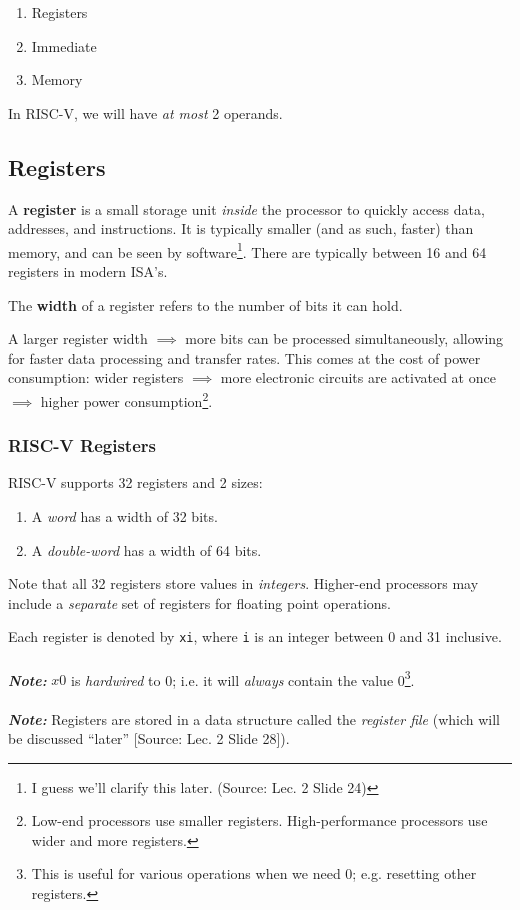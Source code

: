 \documentclass{report}
\newcommand{\definition}[2]{\begin{tcolorbox}[title={Definition: #1}]{#2}\end{tcolorbox}}
\newcommand{\aside}[2]{\begin{tcolorbox}[colback=orange!5!white,colframe=black!75!orange,title={Aside:
      #1}]{#2}\end{tcolorbox}}
\begin{document}
\begin{enumerate}[label=\textit{(\roman*)}]
\item Registers
\item Immediate
\item Memory
\end{enumerate}
In RISC-V, we will have \textit{at most} 2 operands.

\subsection{Registers}
\definition{Register}{
  A \textbf{register} is a small storage unit \textit{inside} the processor to quickly access data,
  addresses, and instructions. It is typically smaller (and as such, faster) than memory, and can be
  seen by software\footnote{I guess we'll clarify this later. (Source: Lec. 2 Slide 24)}. There are
  typically between 16 and 64 registers in modern ISA's.
}

\definition{Register Width}{
  The \textbf{width} of a register refers to the number of bits it can hold.
}

A larger register width $\implies$ more bits can be processed simultaneously, allowing for faster
data processing and transfer rates. This comes at the cost of power consumption: wider registers
$\implies$ more electronic circuits are activated at once $\implies$ higher power
consumption\footnote{Low-end processors use smaller registers. High-performance processors use wider
  and more registers.}.


\subsubsection{RISC-V Registers}
RISC-V supports 32 registers and 2 sizes:

\begin{enumerate}[label=\textit{(\roman*)}]
\item A \textit{word} has a width of 32 bits.
\item A \textit{double-word} has a width of 64 bits.
\end{enumerate}

\aside{Floating Point Registers}{
  Note that all 32 registers store values in \textit{integers}. Higher-end processors may include a
  \textit{separate} set of registers for floating point operations.
}
Each register is denoted by \texttt{xi}, where \texttt{i} is an integer between 0 and 31 inclusive. \\ \\
\textbf{\textit{Note:}} $x0$ is \textit{hardwired} to 0; i.e. it will \textit{always} contain the
value 0\footnote{This is useful for various operations when we need 0; e.g. resetting other
  registers.}. \\ \\
\textbf{\textit{Note:}} Registers are stored in a data structure called the \textit{register file}
(which will be discussed ``later'' [Source: Lec. 2 Slide 28]).
\end{document}
